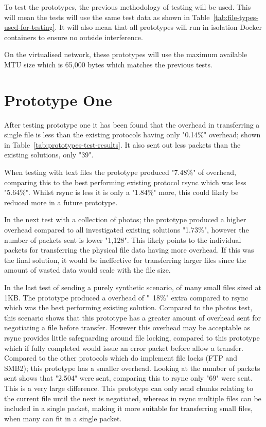 To test the prototypes, the previous methodology of testing will be used. This will mean the tests will use the same test data as shown in Table~\ref{tab:file-types-used-for-testing}. It will also mean that all prototypes will run in isolation Docker containers to ensure no outside interference.

On the virtualised network, these prototypes will use the maximum available MTU size which is 65,000 bytes which matches the previous tests.

\section{Prototype One}
After testing prototype one it has been found that the overhead in transferring a single file is less than the existing protocols having only "0.14\%" overhead; shown in Table~\ref{tab:prototypes-test-results}. It also sent out less packets than the existing solutions, only "39".

When testing with text files the prototype produced "7.48\%" of overhead, comparing this to the best performing existing protocol rsync which was less "5.64\%". Whilst rsync is less it is only a
"1.84\%" more, this could likely be reduced more in a future prototype.

In the next test with a collection of photos; the prototype produced a higher overhead compared to all investigated existing solutions "1.73\%", however the number of packets sent is lower "1,128". This likely points to the individual packets for transferring the physical file data having more overhead. If this was the final solution, it would be ineffective for transferring larger files since the amount of wasted data would scale with the file size.

In the last test of sending a purely synthetic scenario, of many small files sized at 1KB. The prototype produced a overhead of "~18\%" extra compared to rsync which was the best performing existing solution. Compared to the photos test, this scenario shows that this prototype has a greater amount of overhead sent for negotiating a file before transfer. However this overhead may be acceptable as rsync provides little safeguarding around file locking, compared to this prototype which if fully completed would issue an error packet before allow a transfer. Compared to the other protocols which do implement file locks (FTP and SMB2); this prototype has a smaller overhead. Looking at the number of packets sent shows that "2,504" were sent, comparing this to rsync only "69" were sent. This is a very large difference. This prototype can only send chunks relating to the current file until the next is negotiated, whereas in rsync multiple files can be included in a single packet, making it more suitable for transferring small files, when many can fit in a single packet.

